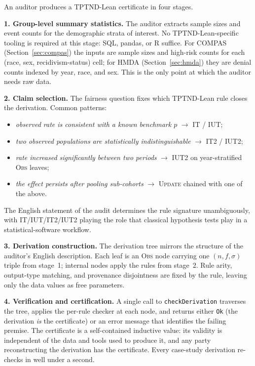 \documentclass{ceurart}
\begin{document}
An auditor produces a TPTND-Lean certificate in four stages.

\smallskip\noindent
\textbf{1. Group-level summary statistics.}
The auditor extracts sample sizes and event counts for the
demographic strata of interest.  No TPTND-Lean-specific tooling is
required at this stage: SQL, pandas, or R suffice.  For COMPAS
(Section~\ref{sec:compas}) the inputs are sample sizes and
high-risk counts for each (race, sex, recidivism-status) cell;
for HMDA (Section~\ref{sec:hmda}) they are denial counts indexed
by year, race, and sex.  This is the only point at which the
auditor needs raw data.

\smallskip\noindent
\textbf{2. Claim selection.}
The fairness question fixes which TPTND-Lean rule closes the
derivation.  Common patterns:
\begin{itemize}
\item \emph{observed rate is consistent with a known benchmark
  $p$} $\to$ \textsc{IT} / \textsc{IUT};
\item \emph{two observed populations are statistically
  indistinguishable} $\to$ \textsc{IT2} / \textsc{IUT2};
\item \emph{rate increased significantly between two periods}
  $\to$ \textsc{IUT2} on year-stratified \textsc{Obs} leaves;
\item \emph{the effect persists after pooling sub-cohorts}
  $\to$ \textsc{Update} chained with one of the above.
\end{itemize}
\noindent
The English statement of the audit determines the rule signature
unambiguously, with \textsc{IT}/\textsc{IUT}/\textsc{IT2}/\textsc{IUT2}
playing the role that classical hypothesis tests play in a
statistical-software workflow.

\smallskip\noindent
\textbf{3. Derivation construction.}
The derivation tree mirrors the structure of the auditor's
English description.  Each leaf is an \textsc{Obs} node carrying
one $(n, f, \sigma)$ triple from stage~1; internal nodes apply
the rules from stage~2.  Rule arity, output-type matching, and
provenance disjointness are fixed by the rule, leaving only the
data values as free parameters.

\smallskip\noindent
\textbf{4. Verification and certification.}
A single call to \texttt{checkDerivation} traverses the tree,
applies the per-rule checker at each node, and returns either
\texttt{Ok} (the derivation \emph{is} the certificate) or an
error message that identifies the failing premise.  The
certificate is a self-contained inductive value: its validity is
independent of the data and tools used to produce it, and any
party reconstructing the derivation has the certificate.  Every
case-study derivation re-checks in well under a second.
\end{document}

